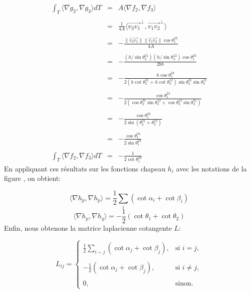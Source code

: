 \[
\begin{array}{lcl}
\displaystyle\int_T \langle \nabla g_2, \nabla g_3 \rangle dT &= &A\langle \nabla f_2, \nabla f_3 \rangle\\\\
&=& \displaystyle\frac{1}{4A} \langle \overrightarrow{v_3v_1}^\perp, \overrightarrow{v_1v_2}^\perp \rangle\\\\
&=& -\displaystyle\frac{\|\overrightarrow{v_3v_1}\|\|\overrightarrow{v_1v_2}\| \cos \theta_1^{23}}{4A}\\\\
&=& -\displaystyle\frac{(h/\sin \theta_2^{31})(h/\sin \theta_3^{12}) \cos \theta_1^{23}}{2bh}\\\\
&=& -\displaystyle\frac{h \cos \theta_1^{23}}{2(h \cot \theta_2^{31} + h \cot \theta_3^{12}) \sin \theta_2^{31} \sin \theta_3^{12}}\\\\
&=& -\displaystyle\frac{\cos \theta_1^{23}}{2(\cos \theta_2^{31} \sin \theta_3^{12} + \cos \theta_3^{12} \sin \theta_2^{31})}\\\\
&=& -\displaystyle\frac{\cos \theta_1^{23}}{2 \sin(\theta_2^{31} + \theta_3^{12})}\\\\
&=& -\displaystyle\frac{\cos \theta_1^{23}}{2 \sin \theta_1^{23}}\\\\
\displaystyle\int_T \langle \nabla f_2, \nabla f_3 \rangle dT&=& -\displaystyle\frac{1}{2 \cot \theta_1^{23}}
\end{array}
\]
En appliquant ces résultats sur les fonctions chapeau \(h_i\) avec les notations de la figure  , on obtient:

\[
\langle \nabla h_p, \nabla h_p \rangle = \frac{1}{2} \sum_i (\cot \alpha_i + \cot \beta_i)
\]
\[
\langle \nabla h_p, \nabla h_q \rangle = -\frac{1}{2} (\cot \theta_1 + \cot \theta_2)
\]
Enfin, nous obtenons la matrice laplacienne cotangente \(L\):

\[
L_{ij} =
\begin{cases}
\displaystyle\frac{1}{2} \sum_{i\sim j} (\cot \alpha_j + \cot \beta_j), & \text{si } i = j, \\\\
-\displaystyle\frac{1}{2} (\cot \alpha_j + \cot \beta_j), & \text{si } i \neq j, \\\\
0, & \text{sinon}.
\end{cases}
\]



